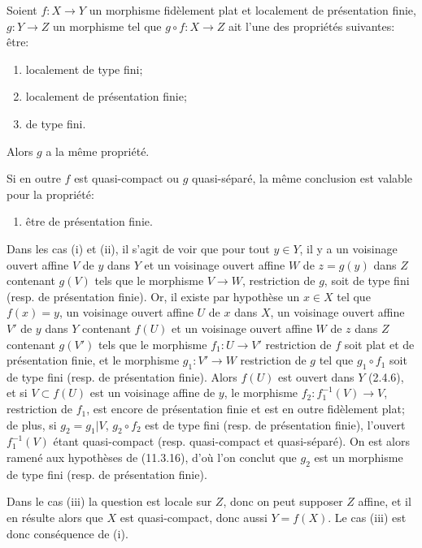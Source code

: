 \begin{lemma}[17.7.5]
\label{IV.17.7.5}
Soient $f:X\to Y$ un morphisme fidèlement plat et localement de présentation finie, $g:Y\to Z$ un morphisme tel que $g\circ f:X\to Z$ ait l'une des propriétés suivantes: être:
\begin{enumerate}
  \item[\textup{(i)}] localement de type fini;
  \item[\textup{(ii)}] localement de présentation finie;
  \item[\textup{(iii)}] de type fini.
\end{enumerate}

Alors $g$ a la même propriété.

Si en outre $f$ est quasi-compact ou $g$ quasi-séparé, la même conclusion est valable pour la propriété:
\begin{enumerate}
  \item[\textup{(iv)}] être de présentation finie.
\end{enumerate}
\end{lemma}

Dans les cas (i) et (ii), il s'agit de voir que pour tout $y\in Y$, il y a un voisinage ouvert affine $V$ de $y$ dans $Y$ et un voisinage ouvert affine $W$ de $z=g(y)$ dans $Z$ contenant $g(V)$ tels que le morphisme $V\to W$, restriction de $g$, soit de type fini (resp. de présentation finie). Or, il existe par hypothèse un $x\in X$ tel que $f(x)=y$, un voisinage ouvert affine $U$ de $x$ dans $X$, un voisinage ouvert affine $V'$ de $y$ dans $Y$ contenant $f(U)$ et un voisinage ouvert affine $W$ de $z$ dans $Z$ contenant $g(V')$ tels que le morphisme $f_1:U\to V'$ restriction de $f$ soit plat et de présentation finie, et le morphisme $g_1:V'\to W$ restriction de $g$ tel que $g_1\circ f_1$ soit de type fini (resp. de présentation finie). Alors $f(U)$ est ouvert dans $Y$ (2.4.6), et si $V\subset f(U)$ est un voisinage affine de $y$, le morphisme $f_2:f_1^{-1}(V)\to V$,
restriction de $f_1$, est encore de présentation finie et est en outre fidèlement plat; de plus, si $g_2=g_1|V$, $g_2\circ f_2$ est de type fini (resp. de présentation finie), l'ouvert $f_1^{-1}(V)$ étant quasi-compact (resp. quasi-compact et quasi-séparé). On est alors ramené aux hypothèses de (11.3.16), d'où l'on conclut que $g_2$ est un morphisme de type fini (resp. de présentation finie).

Dans le cas (iii) la question est locale sur $Z$, donc on peut supposer $Z$ affine, et il en résulte alors que $X$ est quasi-compact, donc aussi $Y=f(X)$. Le cas (iii) est donc conséquence de (i).

